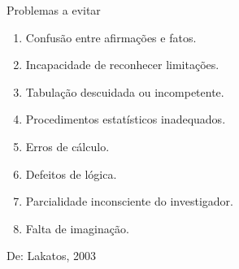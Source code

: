 \documentclass{beamer}
\begin{document}
\begin{frame}{Problemas a evitar}
  \begin{enumerate}
  \item Confusão entre afirmações e fatos. %
  \item Incapacidade de reconhecer limitações.%
  \item Tabulação descuidada ou incompetente. %
  \item Procedimentos estatísticos inadequados. %
  \item Erros de cálculo. %
  \item Defeitos de lógica.%
  \item Parcialidade inconsciente do investigador.%
  \item Falta de imaginação. %
  \end{enumerate}
  De: Lakatos, 2003
\end{frame}


\end{document}
